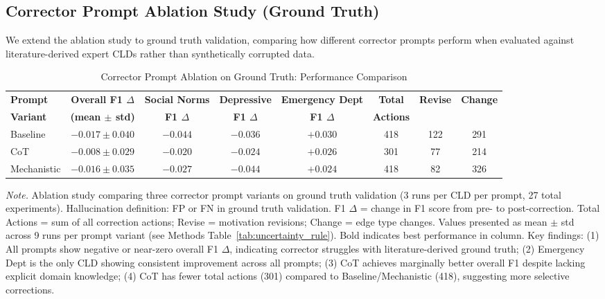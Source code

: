 \documentclass{article}
\begin{document}
\subsection{Corrector Prompt Ablation Study (Ground Truth)}

We extend the ablation study to ground truth validation, comparing how different corrector prompts perform when evaluated against literature-derived expert CLDs rather than synthetically corrupted data.

\begin{table}[H]
\centering
\caption{Corrector Prompt Ablation on Ground Truth: Performance Comparison}
\label{tab:rq1b_prompt_ablation_groundtruth}
\begin{threeparttable}
\begin{tabular}{lccccccc}
\toprule
\textbf{Prompt} & \textbf{Overall F1 $\Delta$} & \textbf{Social Norms} & \textbf{Depressive} & \textbf{Emergency Dept} & \textbf{Total} & \textbf{Revise} & \textbf{Change} \\
\textbf{Variant} & \textbf{(mean $\pm$ std)} & \textbf{F1 $\Delta$} & \textbf{F1 $\Delta$} & \textbf{F1 $\Delta$} & \textbf{Actions} & & \\
\midrule
Baseline        & $-0.017 \pm 0.040$ & $-0.044$ & $-0.036$ & $\mathbf{+0.030}$ & 418 & 122 & 291 \\
\midrule
CoT             & $\mathbf{-0.008 \pm 0.029}$ & $-0.020$ & $\mathbf{-0.024}$ & $+0.026$ & 301 & 77 & 214 \\
\midrule
Mechanistic     & $-0.016 \pm 0.035$ & $\mathbf{-0.027}$ & $-0.044$ & $+0.024$ & 418 & 82 & 326 \\
\bottomrule
\end{tabular}
\begin{tablenotes}
\small
\item \textit{Note.} Ablation study comparing three corrector prompt variants on ground truth validation (3 runs per CLD per prompt, 27 total experiments). 
Hallucination definition: FP or FN in ground truth validation.
F1 $\Delta$ = change in F1 score from pre- to post-correction.
Total Actions = sum of all correction actions; Revise = motivation revisions; Change = edge type changes.
Values presented as mean $\pm$ std across 9 runs per prompt variant (see Methods Table~\ref{tab:uncertainty_rule}).
Bold indicates best performance in column.
Key findings: (1) All prompts show negative or near-zero overall F1 $\Delta$, indicating corrector struggles with literature-derived ground truth; (2) Emergency Dept is the only CLD showing consistent improvement across all prompts; (3) CoT achieves marginally better overall F1 despite lacking explicit domain knowledge; (4) CoT has fewer total actions (301) compared to Baseline/Mechanistic (418), suggesting more selective corrections.
\end{tablenotes}
\end{threeparttable}
\end{table}
\end{document}
